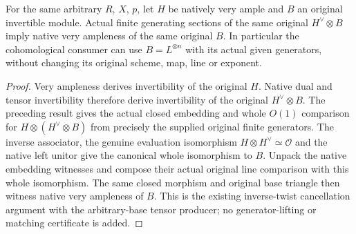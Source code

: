 \begin{theorem}
\label{thm:general-native-veryample-original-inverse-twist-generators}
\leanok
For the same arbitrary $R$, $X$, $p$, let $H$ be natively very ample and
$B$ an original invertible module. Actual finite generating sections of
the same original $H^\vee\otimes B$ imply native very ampleness of the
same original $B$. In particular the cohomological consumer can use
$B=L^{\otimes n}$ with its actual given generators, without changing
its original scheme, map, line or exponent.
\end{theorem}
\begin{proof}
Very ampleness derives invertibility of the original $H$. Native dual
and tensor invertibility therefore derive invertibility of the original
$H^\vee\otimes B$. The preceding result gives the actual closed embedding
and whole $O(1)$ comparison for $H\otimes(H^\vee\otimes B)$ from precisely
the supplied original finite generators. The inverse associator,
the genuine evaluation isomorphism $H\otimes H^\vee\simeq\mathcal O$
and the native left unitor give the canonical whole isomorphism to $B$.
Unpack the native embedding witnesses and compose their actual original
line comparison with this whole isomorphism. The same closed morphism
and original base triangle then witness native very ampleness of $B$.
This is the existing inverse-twist cancellation argument with the
arbitrary-base tensor producer; no generator-lifting or matching
certificate is added.
\end{proof}
